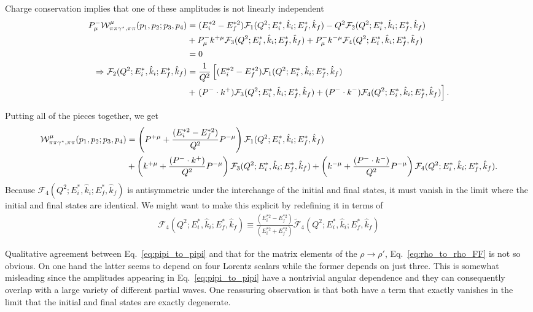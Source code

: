Charge conservation implies that one of these amplitudes is not linearly independent
\begin{align}
P^-_\mu{\mathcal{W}}^{\mu}_{\pi\pi\gamma^\star,\pi\pi}(p_1,p_2;p_3,p_4)
&=
(E_i^{*2}-E_f^{*2})\mathcal{F}_{1}(Q^2;E_i^*,\hat{k}_i;E_f^*,\hat{k}_f)
-Q^2 \mathcal{F}_{2}(Q^2;E_i^*,\hat{k}_i;E_f^*,\hat{k}_f)
\nonumber\\
&+
P^-_\mu k^{+\mu}\mathcal{F}_{3}(Q^2;E_i^*,\hat{k}_i;E_f^*,\hat{k}_f)
+
P^-_\mu k^{-\mu}\mathcal{F}_{4}(Q^2;E_i^*,\hat{k}_i;E_f^*,\hat{k}_f)
\\
&=0
\\
\Rightarrow
\mathcal{F}_{2}(Q^2;E_i^*,\hat{k}_i;E_f^*,\hat{k}_f)
&=\frac{1}{Q^2}
\left[
(E_i^{*2}-E_f^{*2})\mathcal{F}_{1}(Q^2;E_i^*,\hat{k}_i;E_f^*,\hat{k}_f)
\right.
\nonumber\\
&+
\left.
(P^-\cdot k^{+})\mathcal{F}_{3}(Q^2;E_i^*,\hat{k}_i;E_f^*,\hat{k}_f)
+
(P^-\cdot k^{-})\mathcal{F}_{4}(Q^2;E_i^*,\hat{k}_i;E_f^*,\hat{k}_f)
\right].
\end{align}

Putting all of the pieces together, we get
\begin{align}
{\mathcal{W}}^{\mu}_{\pi\pi\gamma^\star,\pi\pi}(p_1,p_2;p_3,p_4)&=
\left(P^{+\mu}+\frac{(E_i^{*2}-E_f^{*2})}{Q^2} P^{-\mu}\right)\mathcal{F}_{1}(Q^2;E_i^*,\hat{k}_i;E_f^*,\hat{k}_f)
\nonumber\\
&+
\left(k^{+\mu}+\frac{(P^-\cdot k^{+})}{Q^2} P^{-\mu}\right)
\mathcal{F}_{3}(Q^2;E_i^*,\hat{k}_i;E_f^*,\hat{k}_f)
+
\left(k^{-\mu}+\frac{(P^-\cdot k^{-})}{Q^2} P^{-\mu}\right)
\mathcal{F}_{4}(Q^2;E_i^*,\hat{k}_i;E_f^*,\hat{k}_f).
\label{eq:pipi_to_pipi}
\end{align}
Because $\mathcal{F}_{4}(Q^2;E_i^*,\hat{k}_i;E_f^*,\hat{k}_f)$ is antisymmetric under the interchange of the initial and final states, it must vanish in the limit where the initial and final states are identical. We might want to make this explicit by redefining it in terms of 
\begin{align}
\mathcal{F}_{4}(Q^2;E_i^*,\hat{k}_i;E_f^*,\hat{k}_f)
\equiv 
\frac{(E_i^{*2}-E_f^{*2})}{(E_i^{*2}+E_f^{*2})}
\widetilde{\mathcal{F}}_{4}(Q^2;E_i^*,\hat{k}_i;E_f^*,\hat{k}_f)
\end{align}


Qualitative agreement between Eq.~\ref{eq:pipi_to_pipi} and that for the matrix elements of the $\rho\to\rho'$, Eq.~\ref{eq:rho_to_rho_FF} is not so obvious. On one hand the latter seems to depend on four Lorentz scalars while the former depends on just three. This is somewhat misleading since the amplitudes appearing in Eq.~\ref{eq:pipi_to_pipi} have a nontrivial angular dependence and they can consequently overlap with a large variety of different partial waves. One reassuring observation is that both have a term that exactly vanishes in the limit that the initial and final states are exactly degenerate. 


